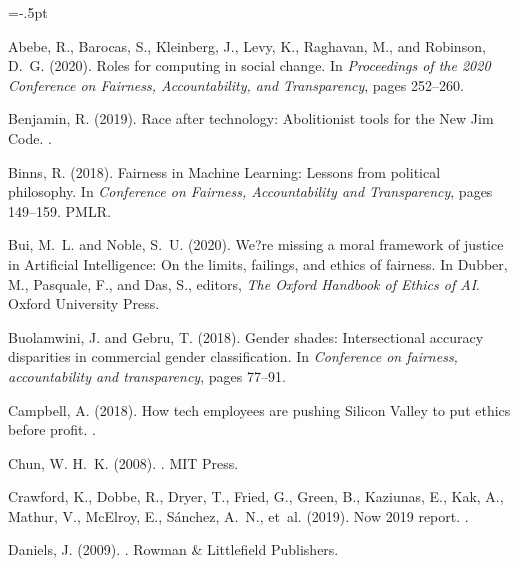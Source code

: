 \documentclass[11pt]{article}
\begin{document}
\begin{thebibliography}{10}
\itemsep=-.5pt
 
Abebe, R., Barocas, S., Kleinberg, J., Levy, K., Raghavan, M., and Robinson,
  D.~G. (2020).
\newblock Roles for computing in social change.
\newblock In {\em Proceedings of the 2020 Conference on Fairness,
  Accountability, and Transparency}, pages 252--260.

Benjamin, R. (2019).
\newblock Race after technology: Abolitionist tools for the {New Jim Code}.
.

Binns, R. (2018).
\newblock Fairness in {M}achine {L}earning: Lessons from political philosophy.
\newblock In {\em Conference on Fairness, Accountability and Transparency},
  pages 149--159. PMLR.

Bui, M.~L. and Noble, S.~U. (2020).
\newblock We?re missing a moral framework of justice in {A}rtificial
  {I}ntelligence: On the limits, failings, and ethics of fairness.
\newblock In Dubber, M., Pasquale, F., and Das, S., editors, {\em The Oxford
  Handbook of Ethics of AI}. Oxford University Press.

Buolamwini, J. and Gebru, T. (2018).
\newblock Gender shades: Intersectional accuracy disparities in commercial
  gender classification.
\newblock In {\em Conference on fairness, accountability and transparency},
  pages 77--91.

Campbell, A. (2018).
\newblock How tech employees are pushing {S}ilicon {V}alley to put ethics
  before profit.
.

Chun, W. H.~K. (2008).
.
\newblock MIT Press.

Crawford, K., Dobbe, R., Dryer, T., Fried, G., Green, B., Kaziunas, E., Kak,
  A., Mathur, V., McElroy, E., S{\'a}nchez, A.~N., et~al. (2019).
 {N}ow 2019 report.
.

Daniels, J. (2009).
.
\newblock Rowman \& Littlefield Publishers.


\end{thebibliography}
\end{document}
